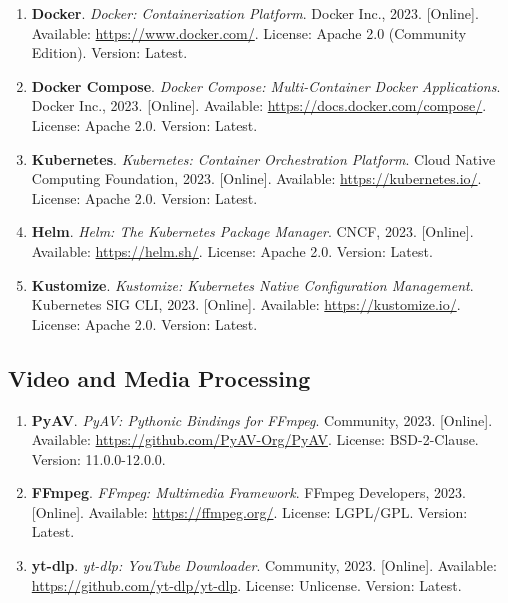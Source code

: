 \begin{enumerate}[resume]
    \item \textbf{Docker}. \textit{Docker: Containerization Platform}. 
    Docker Inc., 2023. [Online]. Available: \url{https://www.docker.com/}. 
    License: Apache 2.0 (Community Edition). Version: Latest.
    
    \item \textbf{Docker Compose}. \textit{Docker Compose: Multi-Container Docker Applications}. 
    Docker Inc., 2023. [Online]. Available: \url{https://docs.docker.com/compose/}. 
    License: Apache 2.0. Version: Latest.
    
    \item \textbf{Kubernetes}. \textit{Kubernetes: Container Orchestration Platform}. 
    Cloud Native Computing Foundation, 2023. [Online]. Available: \url{https://kubernetes.io/}. 
    License: Apache 2.0. Version: Latest.
    
    \item \textbf{Helm}. \textit{Helm: The Kubernetes Package Manager}. 
    CNCF, 2023. [Online]. Available: \url{https://helm.sh/}. 
    License: Apache 2.0. Version: Latest.
    
    \item \textbf{Kustomize}. \textit{Kustomize: Kubernetes Native Configuration Management}. 
    Kubernetes SIG CLI, 2023. [Online]. Available: \url{https://kustomize.io/}. 
    License: Apache 2.0. Version: Latest.
\end{enumerate}

\subsection*{Video and Media Processing}

\begin{enumerate}[resume]
    \item \textbf{PyAV}. \textit{PyAV: Pythonic Bindings for FFmpeg}. 
    Community, 2023. [Online]. Available: \url{https://github.com/PyAV-Org/PyAV}. 
    License: BSD-2-Clause. Version: 11.0.0-12.0.0.
    
    \item \textbf{FFmpeg}. \textit{FFmpeg: Multimedia Framework}. 
    FFmpeg Developers, 2023. [Online]. Available: \url{https://ffmpeg.org/}. 
    License: LGPL/GPL. Version: Latest.
    
    \item \textbf{yt-dlp}. \textit{yt-dlp: YouTube Downloader}. 
    Community, 2023. [Online]. Available: \url{https://github.com/yt-dlp/yt-dlp}. 
    License: Unlicense. Version: Latest.
\end{enumerate}

